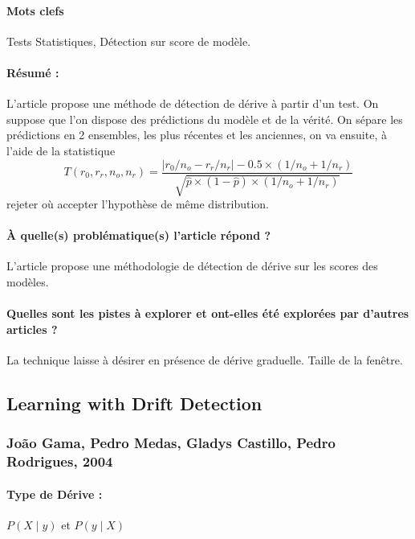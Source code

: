 \documentclass[11pt,a4paper]{report}
\begin{document}
\paragraph{Mots clefs} Tests Statistiques, Détection sur score de modèle.

\paragraph{Résumé :} L'article propose une méthode de détection de dérive à partir d'un test. On suppose que l'on dispose des prédictions du modèle et de la vérité. On sépare les prédictions en 2 ensembles, les plus récentes et les anciennes, on va ensuite, à l'aide de la statistique $$T\left(r_{0}, r_{r}, n_{o}, n_{r}\right)=\frac{\left|r_{0} / n_{o}-r_{r} / n_{r}\right|-0.5 \times\left(1 / n_{o}+1 / n_{r}\right)}{\sqrt{\hat{p} \times(1-\hat{p}) \times\left(1 / n_{o}+1 / n_{r}\right)}}$$ rejeter où accepter l'hypothèse de même distribution. 

\paragraph{À quelle(s) problématique(s) l'article répond ?} L'article propose une méthodologie de détection de dérive sur les scores des modèles.

\paragraph{Quelles sont les pistes à explorer et ont-elles été explorées par d'autres articles ?} La technique laisse à désirer en présence de dérive graduelle. Taille de la fenêtre.










\subsection{Learning with Drift Detection}
\subsubsection{João Gama, Pedro Medas, Gladys Castillo, Pedro Rodrigues, 2004}

\paragraph{Type de Dérive :} $P(X\mid y)$ et $P(y \mid X)$
\end{document}
